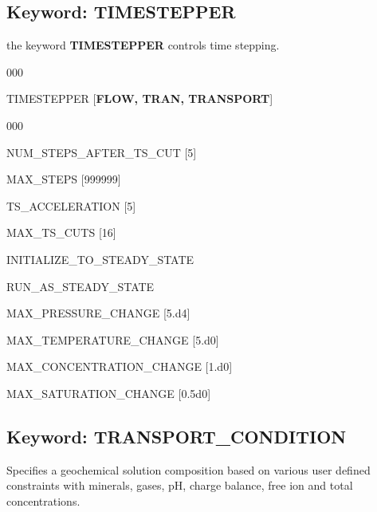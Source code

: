 \documentclass[12pt]{article}
\begin{document}
\newpage
\protect\hypertarget{target_timestep}{}

\subsection{Keyword: TIMESTEPPER}

 the keyword {\bf TIMESTEPPER} controls time stepping.

\begin{deflist}{000}
\item[TIMESTEPPER] [{\bf FLOW, TRAN, TRANSPORT}]
\begin{deflist}{000}
\item[NUM\_STEPS\_AFTER\_TS\_CUT] [5]
\item[MAX\_STEPS] [999999]
\item[TS\_ACCELERATION] [5]
\item[MAX\_TS\_CUTS] [16]
\item[INITIALIZE\_TO\_STEADY\_STATE]
\item[RUN\_AS\_STEADY\_STATE]
\item[MAX\_PRESSURE\_CHANGE] [5.d4]
\item[MAX\_TEMPERATURE\_CHANGE] [5.d0]
\item[MAX\_CONCENTRATION\_CHANGE] [1.d0]
\item[MAX\_SATURATION\_CHANGE] [0.5d0]
\end{deflist}
\item[\keyend]
\end{deflist}



\hyperlink{target_key}{\return}


\newpage
\protect\hypertarget{target_trans_cond}{}

\subsection{Keyword: TRANSPORT\_CONDITION}

 Specifies a geochemical solution composition based on various user defined constraints with minerals, gases, pH, charge balance, free ion and total concentrations.
\end{document}
